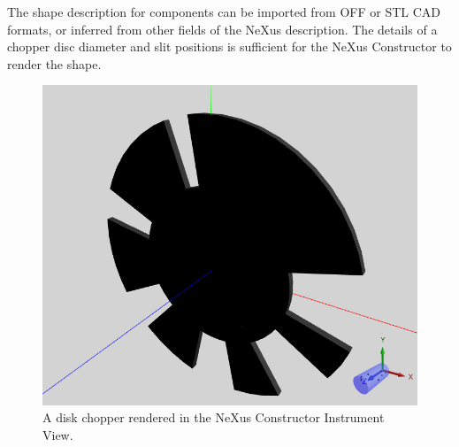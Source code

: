 The shape description for components can be imported from OFF or STL CAD formats, or inferred from other fields of the NeXus description.
The details of a chopper disc diameter and slit positions is sufficient for the NeXus Constructor to render the shape.

\begin{figure}
	\includegraphics[width=0.6\linewidth]{chopperinstrumentview.png}
	\caption{A disk chopper rendered in the NeXus Constructor Instrument View.}
\end{figure}

